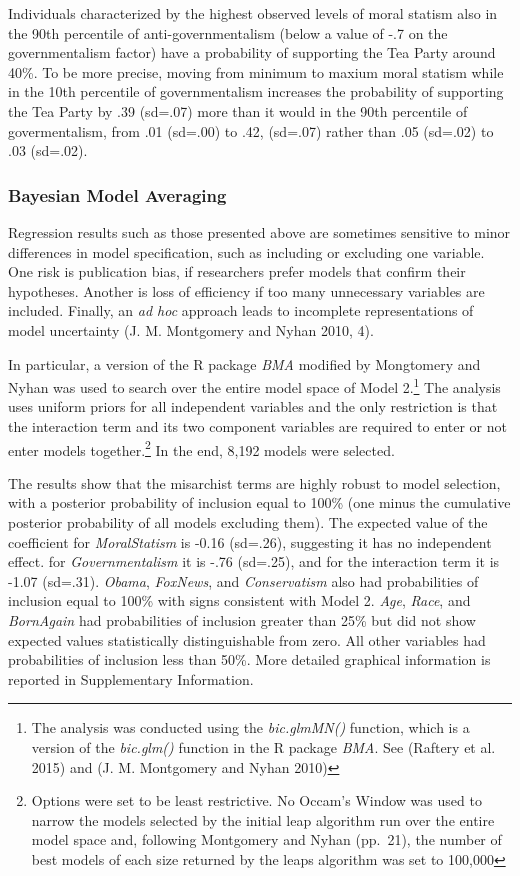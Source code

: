 \documentclass[12pt,]{article}
\let\rmarkdownfootnote\footnote%
\def\footnote{\protect\rmarkdownfootnote}
\begin{document}
Individuals characterized by the highest observed levels of moral
statism also in the 90th percentile of anti-governmentalism (below a
value of -.7 on the governmentalism factor) have a probability of
supporting the Tea Party around 40\%. To be more precise, moving from
minimum to maxium moral statism while in the 10th percentile of
governmentalism increases the probability of supporting the Tea Party by
.39 (sd=.07) more than it would in the 90th percentile of
govermentalism, from .01 (sd=.00) to .42, (sd=.07) rather than .05
(sd=.02) to .03 (sd=.02).

\clearpage

\subsubsection{Bayesian Model Averaging}\label{bayesian-model-averaging}

Regression results such as those presented above are sometimes sensitive
to minor differences in model specification, such as including or
excluding one variable. One risk is publication bias, if researchers
prefer models that confirm their hypotheses. Another is loss of
efficiency if too many unnecessary variables are included. Finally, an
\emph{ad hoc} approach leads to incomplete representations of model
uncertainty (J. M. Montgomery and Nyhan 2010, 4).

In particular, a version of the R package \emph{BMA} modified by
Mongtomery and Nyhan was used to search over the entire model space of
Model 2.\footnote{The analysis was conducted using the
  \emph{bic.glmMN()} function, which is a version of the
  \emph{bic.glm()} function in the R package \emph{BMA}. See (Raftery et
  al. 2015) and (J. M. Montgomery and Nyhan 2010)} The analysis uses
uniform priors for all independent variables and the only restriction is
that the interaction term and its two component variables are required
to enter or not enter models together.\footnote{Options were set to be
  least restrictive. No Occam's Window was used to narrow the models
  selected by the initial leap algorithm run over the entire model space
  and, following Montgomery and Nyhan (pp.~21), the number of best
  models of each size returned by the leaps algorithm was set to 100,000}
In the end, 8,192 models were selected.

The results show that the misarchist terms are highly robust to model
selection, with a posterior probability of inclusion equal to 100\% (one
minus the cumulative posterior probability of all models excluding
them). The expected value of the coefficient for \emph{MoralStatism} is
-0.16 (sd=.26), suggesting it has no independent effect. for
\emph{Governmentalism} it is -.76 (sd=.25), and for the interaction term
it is -1.07 (sd=.31). \emph{Obama}, \emph{FoxNews}, and
\emph{Conservatism} also had probabilities of inclusion equal to 100\%
with signs consistent with Model 2. \emph{Age}, \emph{Race}, and
\emph{BornAgain} had probabilities of inclusion greater than 25\% but
did not show expected values statistically distinguishable from zero.
All other variables had probabilities of inclusion less than 50\%. More
detailed graphical information is reported in Supplementary Information.
\end{document}
